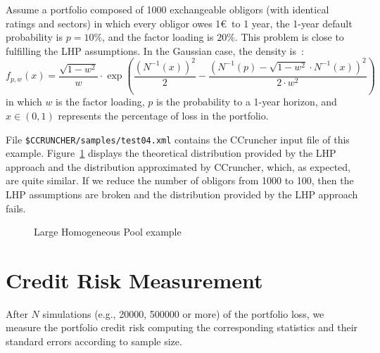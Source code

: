 \documentclass[11pt,fleqn]{book} %
\begin{document}
\begin{example}
	\label{ex:test04}
	Assume a portfolio composed of \num{1000} exchangeable obligors (with 
	identical ratings and sectors) in which every obligor owes 1\euro\ to 
	1 year, the 1-year default probability is $p=10\%$, and the factor loading 
	is $20\%$. This problem is close to fulfilling the LHP assumptions. 
	In the Gaussian case, the density is~\cite[chap. 2.5]{bluhm:2002}: 
	\begin{displaymath}
		f_{p,w}(x) = 
		\frac{\sqrt{1-w^2}}{w} \cdot \exp\left( 
			\frac{\left(N^{-1}(x)\right)^2}{2} -
			\frac{\left(N^{-1}(p) - \sqrt{1-w^2} \cdot N^{-1}(x)\right)^2}{2 \cdot w^2}
		\right)
	\end{displaymath}
	in which $w$ is the factor loading, $p$ is the probability to a 1-year 
	horizon, and $x \in (0,1)$ represents the percentage of loss in the 
	portfolio. 

	File \texttt{\$CCRUNCHER/samples/test04.xml} contains the CCruncher input
	file of this example. Figure~\ref{fig:test04} displays the theoretical
	distribution provided by the LHP approach and the distribution approximated 
	by CCruncher, which, as expected, are quite similar. If we reduce the number 
	of obligors from \num{1000} to \num{100}, then the LHP assumptions are 
	broken and the distribution provided by the LHP approach fails.
\end{example}

\begin{figure}[!ht]
	\centering
	\caption{Large Homogeneous Pool example}
	\label{fig:test04} 
\end{figure}

\section{Credit Risk Measurement}
\label{sec:riskm}

After $N$ simulations (e.g., \num{20000}, \num{500000} or more) of the 
portfolio loss, we measure the portfolio credit risk computing the 
corresponding statistics and their standard errors according to sample size. 
\end{document}
